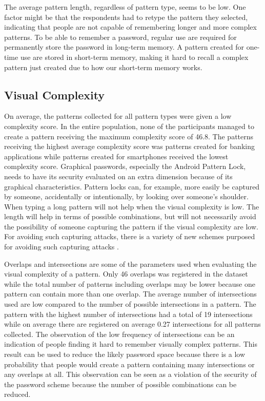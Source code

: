       The average pattern length, regardless of pattern type,  seems to be low. One factor might be that the respondents had to retype the pattern they selected, indicating that people are not capable of remembering longer and more complex patterns. To be able to remember a password, regular use are required for permanently store the password in long-term memory. A pattern created for one-time use are stored in short-term memory, making it hard to recall a complex pattern just created due to how our short-term memory works. 

    \subsection{Visual Complexity}

      On average, the patterns collected for all pattern types were given a low complexity score. In the entire population, none of the participants managed to create a pattern receiving the maximum complexity score of 46.8. The patterns receiving the highest average complexity score was patterns created for banking applications while patterns created for smartphones received the lowest complexity score. Graphical passwords, especially the Android Pattern Lock, needs to have its security evaluated on an extra dimension because of its graphical characteristics. Pattern locks can, for example, more easily be captured by someone, accidentally or intentionally, by looking over someone's shoulder. When typing a long pattern will not help when the visual complexity is low. The length will help in terms of possible combinations, but will not necessarily avoid the possibility of someone capturing the pattern if the visual complexity are low.  For avoiding such capturing attacks, there is a variety of new schemes purposed for avoiding such capturing attacks \cite{Wiedenbeck, IPAS}. 

      Overlaps and intersections are some of the parameters used when evaluating the visual complexity of a pattern. Only 46 overlaps was registered in the dataset while the total number of patterns including overlaps may be lower because one pattern can contain more than one overlap. The average number of intersections used are low compared to the number of possible intersections in a pattern. The pattern with the highest number of intersections had a total of 19 intersections while on average there are registered on average 0.27 intersections for all patterns collected. The observation of the low frequency of intersections can be an indication of people finding it hard to remember visually complex patterns. This result can be used to reduce the likely password space because there is a low probability that people would create a pattern containing many intersections or any overlaps at all. This observation can be seen as a violation of the security of the password scheme because the number of possible combinations can be reduced. 

